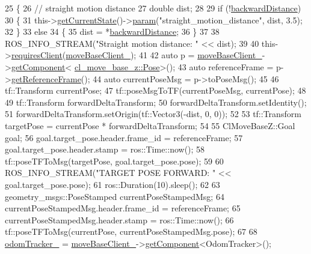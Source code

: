 \begin{DoxyCode}
25 \{
26     \textcolor{comment}{// straight motion distance}
27     \textcolor{keywordtype}{double} dist;
28 
29     \textcolor{keywordflow}{if} (!\hyperlink{classcl__move__base__z_1_1CbNavigateBackwards_abb7099e4e18602f6cf06c4f5534a2a15}{backwardDistance})
30     \{
31         this->\hyperlink{classsmacc_1_1SmaccClientBehavior_abf6773e4dd948f932f11a346dd6e7c2c}{getCurrentState}()->\hyperlink{classsmacc_1_1ISmaccState_a4f2ff8e3eda8aa9bbb60c8ff17d0def1}{param}(\textcolor{stringliteral}{"straight\_motion\_distance"}, dist, 3.5);
32     \}
33     \textcolor{keywordflow}{else}
34     \{
35         dist = *\hyperlink{classcl__move__base__z_1_1CbNavigateBackwards_abb7099e4e18602f6cf06c4f5534a2a15}{backwardDistance};
36     \}
37 
38     ROS\_INFO\_STREAM(\textcolor{stringliteral}{"Straight motion distance: "} << dist);
39 
40     this->\hyperlink{classsmacc_1_1SmaccClientBehavior_a917f001e763a1059af337bf4e164f542}{requiresClient}(\hyperlink{classcl__move__base__z_1_1CbNavigateBackwards_a943c1a790eac9266adf11fbdc078f03a}{moveBaseClient\_});
41 
42     \textcolor{keyword}{auto} p = \hyperlink{classcl__move__base__z_1_1CbNavigateBackwards_a943c1a790eac9266adf11fbdc078f03a}{moveBaseClient\_}->\hyperlink{classsmacc_1_1ISmaccClient_adef78db601749ca63c19e74a27cb88cc}{getComponent}<
      \hyperlink{classcl__move__base__z_1_1Pose}{cl\_move\_base\_z::Pose}>();
43     \textcolor{keyword}{auto} referenceFrame = p->\hyperlink{classcl__move__base__z_1_1Pose_af8c2dc151e74aa8da6b283d1c8563051}{getReferenceFrame}();
44     \textcolor{keyword}{auto} currentPoseMsg = p->toPoseMsg();
45 
46     tf::Transform currentPose;
47     tf::poseMsgToTF(currentPoseMsg, currentPose);
48 
49     tf::Transform forwardDeltaTransform;
50     forwardDeltaTransform.setIdentity();
51     forwardDeltaTransform.setOrigin(tf::Vector3(-dist, 0, 0));
52 
53     tf::Transform targetPose = currentPose * forwardDeltaTransform;
54 
55     ClMoveBaseZ::Goal goal;
56     goal.target\_pose.header.frame\_id = referenceFrame;
57     goal.target\_pose.header.stamp = ros::Time::now();
58     tf::poseTFToMsg(targetPose, goal.target\_pose.pose);
59 
60     ROS\_INFO\_STREAM(\textcolor{stringliteral}{"TARGET POSE FORWARD: "} << goal.target\_pose.pose);
61     ros::Duration(10).sleep();
62 
63     geometry\_msgs::PoseStamped currentPoseStampedMsg;
64     currentPoseStampedMsg.header.frame\_id = referenceFrame;
65     currentPoseStampedMsg.header.stamp = ros::Time::now();
66     tf::poseTFToMsg(currentPose, currentPoseStampedMsg.pose);
67 
68     \hyperlink{classcl__move__base__z_1_1CbNavigateBackwards_a75a8ae7aef6c72e96f4037c4941b0341}{odomTracker\_} = \hyperlink{classcl__move__base__z_1_1CbNavigateBackwards_a943c1a790eac9266adf11fbdc078f03a}{moveBaseClient\_}->\hyperlink{classsmacc_1_1ISmaccClient_adef78db601749ca63c19e74a27cb88cc}{getComponent}<OdomTracker>();

\end{DoxyCode}
